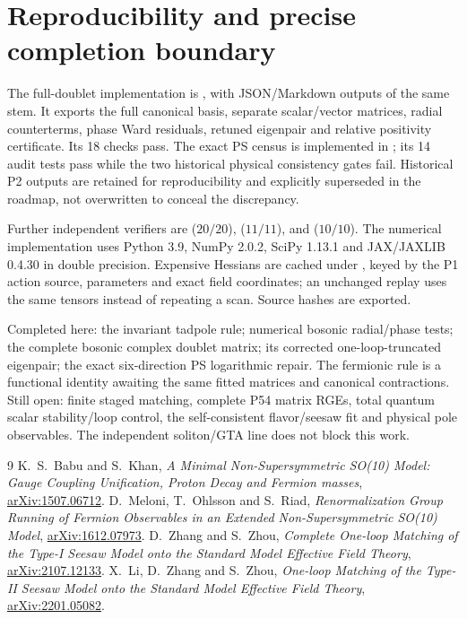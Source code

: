 \documentclass[11pt]{article}
\begin{document}
\section{Reproducibility and precise completion boundary}
The full-doublet implementation is
, with JSON/Markdown
outputs of the same stem. It exports the full canonical basis, separate
scalar/vector matrices, radial counterterms, phase Ward residuals,
retuned eigenpair and relative positivity certificate. Its 18 checks pass.
The exact PS census is implemented in
; its 14 audit tests pass
while the two historical physical consistency gates fail. Historical P2
outputs are retained for reproducibility and explicitly superseded in the
roadmap, not overwritten to conceal the discrepancy.

Further independent verifiers are
 ($20/20$),
 ($11/11$), and
 ($10/10$).
The numerical implementation uses Python 3.9, NumPy 2.0.2, SciPy 1.13.1
and JAX/JAXLIB 0.4.30 in double precision. Expensive Hessians are cached
under , keyed by the P1 action source,
parameters and exact field coordinates; an unchanged replay uses the
same tensors instead of repeating a scan. Source hashes are exported.

Completed here: the invariant tadpole rule; numerical bosonic radial/phase
tests; the complete bosonic complex doublet matrix; its corrected
one-loop-truncated eigenpair; the exact six-direction PS logarithmic repair.
The fermionic rule is a functional identity awaiting the same fitted
matrices and canonical contractions. Still open: finite staged matching,
complete P54 matrix RGEs, total quantum scalar stability/loop control,
the self-consistent flavor/seesaw fit and physical pole observables.
The independent soliton/GTA line does not block this work.

\begin{thebibliography}{9}
 K.~S.~Babu and S.~Khan,
\emph{A Minimal Non-Supersymmetric SO(10) Model: Gauge Coupling
Unification, Proton Decay and Fermion masses},
\href{https://arxiv.org/abs/1507.06712}{arXiv:1507.06712}.
 D.~Meloni, T.~Ohlsson and S.~Riad,
\emph{Renormalization Group Running of Fermion Observables in an
Extended Non-Supersymmetric SO(10) Model},
\href{https://arxiv.org/abs/1612.07973}{arXiv:1612.07973}.
 D.~Zhang and S.~Zhou,
\emph{Complete One-loop Matching of the Type-I Seesaw Model onto the
Standard Model Effective Field Theory},
\href{https://arxiv.org/abs/2107.12133}{arXiv:2107.12133}.
 X.~Li, D.~Zhang and S.~Zhou,
\emph{One-loop Matching of the Type-II Seesaw Model onto the
Standard Model Effective Field Theory},
\href{https://arxiv.org/abs/2201.05082}{arXiv:2201.05082}.
\end{thebibliography}
\end{document}
